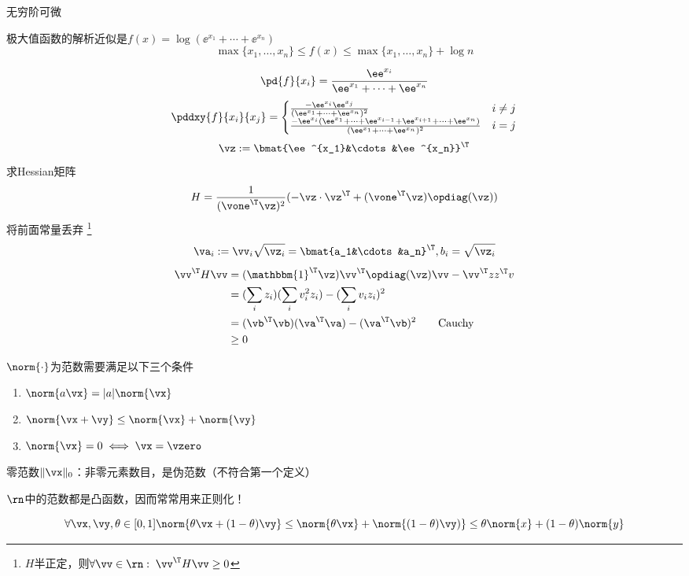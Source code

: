 \begin{definition}[解析近似]
无穷阶可微
\end{definition}

极大值函数的解析近似是$f(x)=\log(\ee^{x_1}+\cdots+\ee^{x_n})$
\[\max\{x_1,\ldots,x_n\}\leq f(x)\leq\max\{x_1,\ldots,x_n\}+\log n\]
\begin{analysis}
\[\pd{f}{x_i}=\frac{\ee^{x_i}}{\ee^{x_1}+\cdots+\ee^{x_n}}\]
\[\pddxy{f}{x_i}{x_j}=\begin{cases}\frac{-\ee^{x_i}\ee^{x_j}}{(\ee^{x_1}+\cdots+\ee^{x_n})^2} & i\ne j\\ \frac{-\ee^{x_i}(\ee^{x_1}+\cdots+\ee^{x_{i-1}}+\ee^{x_{i+1}}+\cdots+\ee^{x_n})}{(\ee^{x_1}+\cdots+\ee^{x_n})^2} & i=j\end{cases}\]
\[\vz:=\bmat{\ee^{x_1}&\cdots&\ee^{x_n}}^\T\]
求Hessian矩阵
\[H=\frac{1}{(\vone^\T \vz)^2}(-\vz\cdot \vz^\T+(\vone^\T \vz)\opdiag(\vz))\]
将前面常量丢弃
\footnote{$H$半正定，则$\forall \vv\in\rn:\;\vv^\T H\vv\geq 0$}
\[\va_i:=\vv_i\sqrt{\vz_i}=\bmat{a_1&\cdots&a_n}^\T,b_i=\sqrt{\vz_i}\]
\[\begin{aligned}
\vv^\T H\vv&=(\mathbbm{1}^\T \vz)\vv^\T \opdiag(\vz)\vv-\vv^\T zz^\T v\\
&=(\sum_i z_i)(\sum_i v_i^2 z_i)-(\sum_i v_i z_i)^2\\
&=(\vb^\T \vb)(\va^\T \va)-(\va^\T \vb)^2\qquad\text{Cauchy}\\
&\geq 0
\end{aligned}\]
\end{analysis}

\begin{definition}[范数]
$\norm{\cdot}$为范数需要满足以下三个条件
\begin{enumerate}
	\item $\norm{a\vx}=|a|\norm{\vx}$
	\item $\norm{\vx+\vy}\leq \norm{\vx}+\norm{\vy}$
	\item $\norm{\vx}=0\iff \vx=\vzero$
\end{enumerate}
零范数$\|\vx\|_0$：非零元素数目，是伪范数（不符合第一个定义）
\end{definition}
\begin{theorem}
$\rn$中的范数都是凸函数，因而常常用来正则化！
\end{theorem}
\begin{analysis}
\[\forall \vx,\vy,\theta\in[0,1]
\norm{\theta \vx+(1-\theta)\vy}\leq \norm{\theta \vx}+\norm{(1-\theta)\vy)}\leq \theta \norm{x}+(1-\theta)\norm{y}\]
\end{analysis}

